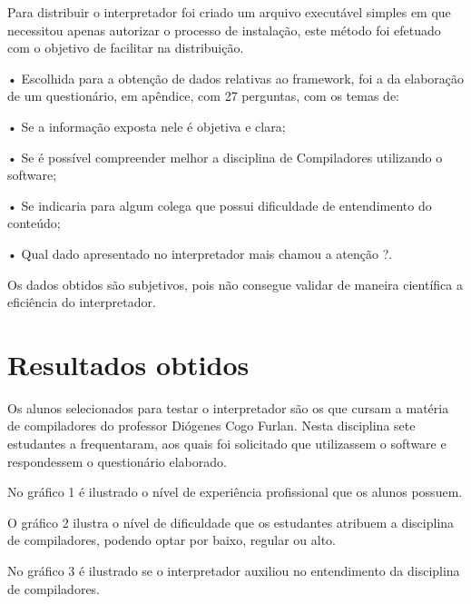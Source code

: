 \documentclass[12pt,oneside,a4paper,chapter=TITLE,section=TITLE,sumario=tradicional]{abntex2}
\begin{document}
Para distribuir o interpretador foi criado um arquivo executável simples em que necessitou apenas autorizar o processo de instalação, este método foi efetuado com o objetivo de facilitar na distribuição.

•	Escolhida para a obtenção de dados relativas ao framework, foi a da elaboração de um questionário, em apêndice, com 27 perguntas, com os temas de:

•	Se a informação exposta nele é objetiva e clara;

•	Se é possível compreender melhor a disciplina de Compiladores utilizando o software;

•	Se indicaria para algum colega que possui dificuldade de entendimento do conteúdo;

•	Qual dado apresentado no interpretador mais chamou a atenção ?.

Os dados obtidos são subjetivos, pois não consegue validar de maneira científica a eficiência do interpretador.

\section{Resultados obtidos}
\label{sec:resultados}

Os alunos selecionados para testar o interpretador são os que cursam a matéria de compiladores do professor Diógenes Cogo Furlan. Nesta disciplina sete estudantes a frequentaram, aos quais foi solicitado que utilizassem o software e respondessem o questionário elaborado.

No gráfico 1 é ilustrado o nível de experiência profissional que os alunos possuem.

\begin{grafico}[H]
\end{grafico}

O gráfico 2 ilustra o nível de dificuldade que os estudantes atribuem a disciplina de compiladores, podendo optar por baixo, regular ou alto.

\begin{grafico}[H]
\end{grafico}

No gráfico 3 é ilustrado se o interpretador auxiliou no entendimento da disciplina de compiladores.
\end{document}
